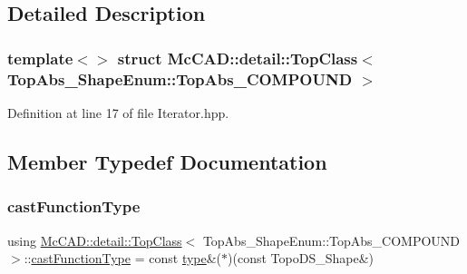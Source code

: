 \subsection{Detailed Description}
\subsubsection*{template$<$$>$\newline
struct Mc\+C\+A\+D\+::detail\+::\+Top\+Class$<$ Top\+Abs\+\_\+\+Shape\+Enum\+::\+Top\+Abs\+\_\+\+C\+O\+M\+P\+O\+U\+N\+D $>$}



Definition at line 17 of file Iterator.\+hpp.



\subsection{Member Typedef Documentation}
\mbox{\label{structMcCAD_1_1detail_1_1TopClass_3_01TopAbs__ShapeEnum_1_1TopAbs__COMPOUND_01_4_ac0820b58a85f0c76bc9de24042a90de0}} 
\subsubsection{\texorpdfstring{cast\+Function\+Type}{castFunctionType}}
{\footnotesize\ttfamily using \hyperlink{structMcCAD_1_1detail_1_1TopClass}{Mc\+C\+A\+D\+::detail\+::\+Top\+Class}$<$ Top\+Abs\+\_\+\+Shape\+Enum\+::\+Top\+Abs\+\_\+\+C\+O\+M\+P\+O\+U\+ND $>$\+::\hyperlink{structMcCAD_1_1detail_1_1TopClass_3_01TopAbs__ShapeEnum_1_1TopAbs__COMPOUND_01_4_ac0820b58a85f0c76bc9de24042a90de0}{cast\+Function\+Type} =  const \hyperlink{structMcCAD_1_1detail_1_1TopClass_3_01TopAbs__ShapeEnum_1_1TopAbs__COMPOUND_01_4_ae793310e8de55b4dfa6feb6fe88166e3}{type}\&($\ast$)(const Topo\+D\+S\+\_\+\+Shape\&)}



